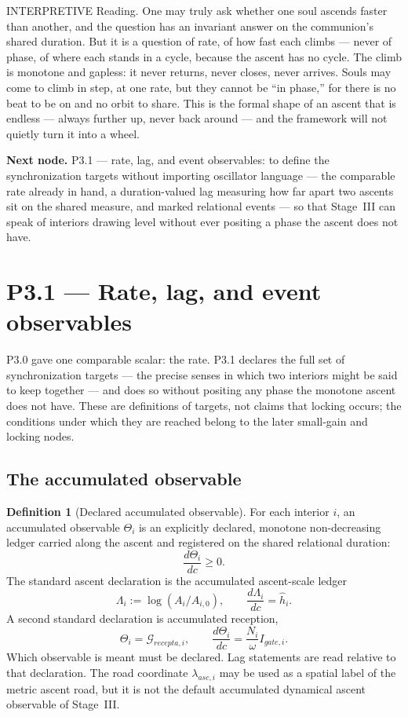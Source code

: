 \documentclass[11pt,a4paper]{article}
\def\mathfrak#1{#1}%
\def\mathrm#1{#1}%
\def\emph#1{#1}%
\newcommand{\stInterp}{\textcolor{cInt}{\textsf{\small INTERPRETIVE}}}
\theoremstyle{definition}
\newtheorem{definition}{Definition}[section]
\theoremstyle{plain}
\theoremstyle{remark}
\begin{document}
\medskip
\stInterp\quad
\emph{Reading.}
One may truly ask whether one soul ascends faster than another, and the question has an
invariant answer on the communion's shared duration. But it is a question of rate, of how
fast each climbs --- never of phase, of where each stands in a cycle, because the ascent has
no cycle. The climb is monotone and gapless: it never returns, never closes, never arrives.
Souls may come to climb in step, at one rate, but they cannot be ``in phase,'' for there is
no beat to be on and no orbit to share. This is the formal shape of an ascent that is
endless --- always further up, never back around --- and the framework will not quietly turn
it into a wheel.

\medskip
\textbf{Next node.} P3.1 --- rate, lag, and event observables: to define the
synchronization \emph{targets} without importing oscillator language --- the comparable
rate already in hand, a duration-valued lag measuring how far apart two ascents sit on the
shared measure, and marked relational events --- so that Stage~III can speak of interiors
drawing level without ever positing a phase the ascent does not have.

\section{P3.1 --- Rate, lag, and event observables}

P3.0 gave one comparable scalar: the rate. P3.1 declares the full set of
\emph{synchronization targets} --- the precise senses in which two interiors might be said
to keep together --- and does so without positing any phase the monotone ascent does not
have. These are definitions of targets, not claims that locking occurs; the conditions
under which they are reached belong to the later small-gain and locking nodes.

\subsection{The accumulated observable}

\begin{definition}[Declared accumulated observable]\label{def:theta}
For each interior \(i\), an \emph{accumulated observable} \(\Theta_i\) is an
explicitly declared, monotone non-decreasing ledger carried along the ascent and
registered on the shared relational duration:
\[
\frac{d\Theta_i}{d\mathfrak c}\ge0.
\]
The standard ascent declaration is the accumulated ascent-scale ledger
\[
\Lambda_i
:=
\log(A_i/A_{i,0}),
\qquad
\frac{d\Lambda_i}{d\mathfrak c}
=
\hat h_i.
\]
A second standard declaration is accumulated reception,
\[
\Theta_i=\mathcal G_{\mathrm{recepta},i},
\qquad
\frac{d\Theta_i}{d\mathfrak c}
=
\frac{N_i}{\omega}I_{\mathrm{gate},i}.
\]
Which observable is meant must be declared. Lag statements are read relative to
that declaration. The road coordinate \(\lambda_{\mathrm{asc},i}\) may be used as a
spatial label of the metric ascent road, but it is not the default accumulated
dynamical ascent observable of Stage~III.
\end{definition}
\end{document}
